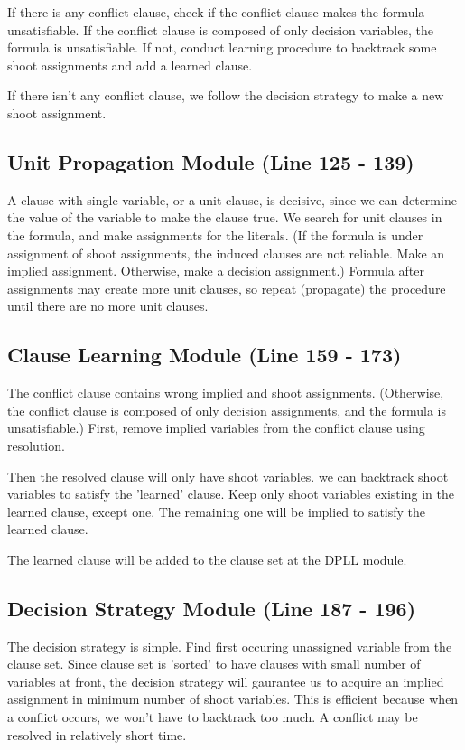 \documentclass[10pt,a4paper]{article}
\begin{document}
	If there is any conflict clause, check if the conflict clause makes the formula unsatisfiable. If the conflict clause is composed of only decision variables, the formula is unsatisfiable. If not, conduct learning procedure to backtrack some shoot assignments and add a learned clause.
	
	If there isn't any conflict clause, we follow the decision strategy to make a new shoot assignment. 
	
	\subsection{Unit Propagation Module {\small (Line 125 - 139)}}
	
	A clause with single variable, or a unit clause, is decisive, since we can determine the value of the variable to make the clause true. We search for unit clauses in the formula, and make assignments for the literals. (If the formula is under assignment of shoot assignments, the induced clauses are not reliable. Make an implied assignment. Otherwise, make a decision assignment.) Formula after assignments may create more unit clauses, so repeat (propagate) the procedure until there are no more unit clauses.
	
	\subsection{Clause Learning Module {\small (Line 159 - 173)}}
	
	The conflict clause contains wrong implied and shoot assignments. (Otherwise, the conflict clause is composed of only decision assignments, and the formula is unsatisfiable.) First, remove implied variables from the conflict clause using resolution.
	
	Then the resolved clause will only have shoot variables. we can backtrack shoot variables to satisfy the 'learned' clause. Keep only shoot variables existing in the learned clause, except one. The remaining one will be implied to satisfy the learned clause.
	
	The learned clause will be added to the clause set at the DPLL module.
	
	\subsection{Decision Strategy Module {\small (Line 187 - 196)}}
	
	The decision strategy is simple. Find first occuring unassigned variable from the clause set. Since clause set is 'sorted' to have clauses with small number of variables at front, the decision strategy will gaurantee us to acquire an implied assignment in minimum number of shoot variables. This is efficient because when a conflict occurs, we won't have to backtrack too much. A conflict may be resolved in relatively short time.
	
\end{document}

